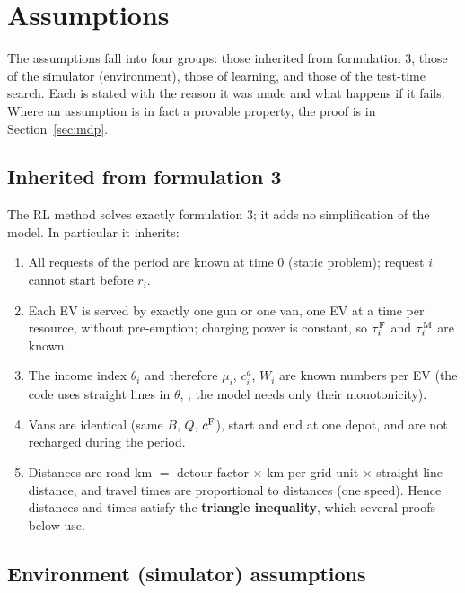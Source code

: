 \section{Assumptions}
\label{sec:assumptions}

The assumptions fall into four groups: those inherited from formulation 3, those of the simulator (environment), those of learning, and those of the test-time search. Each is stated with the reason it was made and what happens if it fails. Where an assumption is in fact a provable property, the proof is in Section~\ref{sec:mdp}.

\subsection{Inherited from formulation 3}

The RL method solves exactly formulation 3; it adds no simplification of the model. In particular it inherits:
\begin{enumerate}[label=F\arabic*.]
  \item All requests of the period are known at time 0 (static problem); request $i$ cannot start before $r_i$.
  \item Each EV is served by exactly one gun or one van, one EV at a time per resource, without pre-emption; charging power is constant, so $\tau^{\mathrm{F}}_i$ and $\tau^{\mathrm{M}}_i$ are known.
  \item The income index $\theta_i$ and therefore $\mu_i$, $c^{a}_i$, $W_i$ are known numbers per EV (the code uses straight lines in $\theta$, ; the model needs only their monotonicity).
  \item Vans are identical (same $B$, $Q$, $c^{\mathrm{F}}$), start and end at one depot, and are not recharged during the period.
  \item Distances are road km $=$ detour factor $\times$ km per grid unit $\times$ straight-line distance, and travel times are proportional to distances (one speed). Hence distances and times satisfy the \textbf{triangle inequality}, which several proofs below use.
\end{enumerate}

\subsection{Environment (simulator) assumptions}

